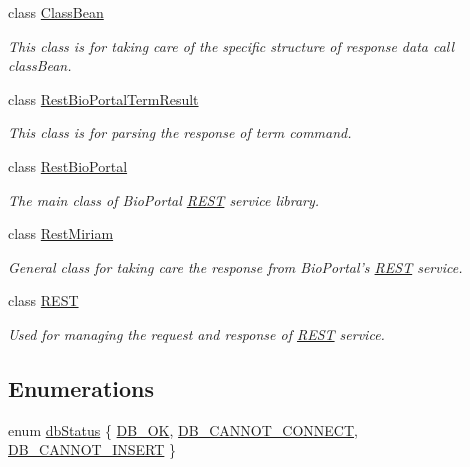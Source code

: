 \begin{DoxyCompactItemize}
class \hyperlink{classunisys_1_1ClassBean}{Class\-Bean}
\begin{DoxyCompactList}\small\item\em This class is for taking care of the specific structure of response data call class\-Bean. \end{DoxyCompactList}\item 
class \hyperlink{classunisys_1_1RestBioPortalTermResult}{Rest\-Bio\-Portal\-Term\-Result}
\begin{DoxyCompactList}\small\item\em This class is for parsing the response of term command. \end{DoxyCompactList}\item 
class \hyperlink{classunisys_1_1RestBioPortal}{Rest\-Bio\-Portal}
\begin{DoxyCompactList}\small\item\em The main class of Bio\-Portal \hyperlink{classunisys_1_1REST}{R\-E\-S\-T} service library. \end{DoxyCompactList}\item 
class \hyperlink{classunisys_1_1RestMiriam}{Rest\-Miriam}
\begin{DoxyCompactList}\small\item\em General class for taking care the response from Bio\-Portal's \hyperlink{classunisys_1_1REST}{R\-E\-S\-T} service. \end{DoxyCompactList}\item 
class \hyperlink{classunisys_1_1REST}{R\-E\-S\-T}
\begin{DoxyCompactList}\small\item\em Used for managing the request and response of \hyperlink{classunisys_1_1REST}{R\-E\-S\-T} service. \end{DoxyCompactList}\end{DoxyCompactItemize}
\subsection*{Enumerations}
\begin{DoxyCompactItemize}
\item 
enum \hyperlink{namespaceunisys_a06abbe485d59787061d5a0ab762a0bf5}{db\-Status} \{ \hyperlink{namespaceunisys_a06abbe485d59787061d5a0ab762a0bf5acb3b534f7025edd0c02c492398b57db7}{D\-B\-\_\-\-O\-K}, 
\hyperlink{namespaceunisys_a06abbe485d59787061d5a0ab762a0bf5a2b0cce7d96d864ec36448039d4a9d85f}{D\-B\-\_\-\-C\-A\-N\-N\-O\-T\-\_\-\-C\-O\-N\-N\-E\-C\-T}, 
\hyperlink{namespaceunisys_a06abbe485d59787061d5a0ab762a0bf5a793c9ad562d8f9cea7dd4dcc93bc957a}{D\-B\-\_\-\-C\-A\-N\-N\-O\-T\-\_\-\-I\-N\-S\-E\-R\-T}
 \}
\end{DoxyCompactItemize}
